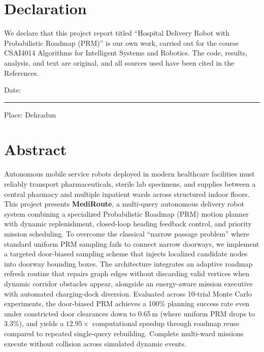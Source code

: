 \documentclass[12pt,a4paper]{article}
\begin{document}
\section*{Declaration}
We declare that this project report titled ``Hospital Delivery Robot with Probabilistic Roadmap (PRM)'' is our own work, carried out for the course CSAI4014 Algorithms for Intelligent Systems and Robotics. The code, results, analysis, and text are original, and all sources used have been cited in the References.

\vspace{0.8cm}
\begin{table}[h]
\centering
{}
\end{table}

\vspace{0.8cm}
Date: \rule{4cm}{0.4pt} \hfill Place: Dehradun
\newpage

\section*{Abstract}
Autonomous mobile service robots deployed in modern healthcare facilities must reliably transport pharmaceuticals, sterile lab specimens, and supplies between a central pharmacy and multiple inpatient wards across structured indoor floors. This project presents \textbf{MediRoute}, a multi-query autonomous delivery robot system combining a specialized Probabilistic Roadmap (PRM) motion planner with dynamic replenishment, closed-loop heading feedback control, and priority mission scheduling. To overcome the classical ``narrow passage problem'' where standard uniform PRM sampling fails to connect narrow doorways, we implement a targeted door-biased sampling scheme that injects localized candidate nodes into doorway bounding boxes. The architecture integrates an adaptive roadmap refresh routine that repairs graph edges without discarding valid vertices when dynamic corridor obstacles appear, alongside an energy-aware mission executive with automated charging-dock diversion. Evaluated across 10-trial Monte Carlo experiments, the door-biased PRM achieves a 100\% planning success rate even under constricted door clearances down to 0.65\,m (where uniform PRM drops to 3.3\%), and yields a $12.95\times$ computational speedup through roadmap reuse compared to repeated single-query rebuilding. Complete multi-ward missions execute without collision across simulated dynamic events.
\end{document}
